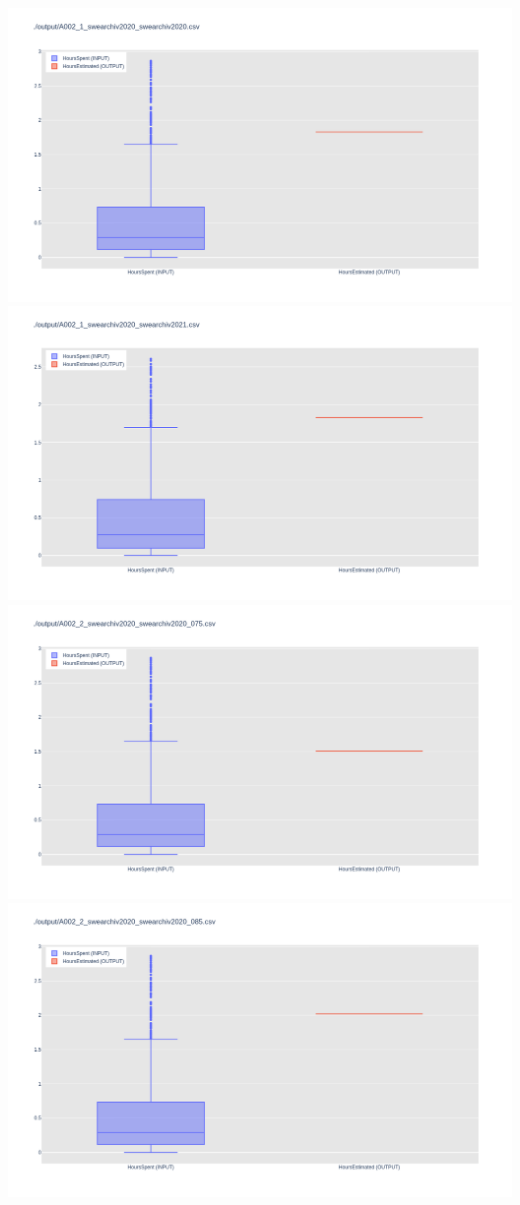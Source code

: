 \includegraphics[width=\textwidth]{Scripts/output/A002_1_swearchiv2020_swearchiv2020.csv.png}
\includegraphics[width=\textwidth]{Scripts/output/A002_1_swearchiv2020_swearchiv2021.csv.png}
\includegraphics[width=\textwidth]{Scripts/output/A002_2_swearchiv2020_swearchiv2020_075.csv.png}
\includegraphics[width=\textwidth]{Scripts/output/A002_2_swearchiv2020_swearchiv2020_085.csv.png}
